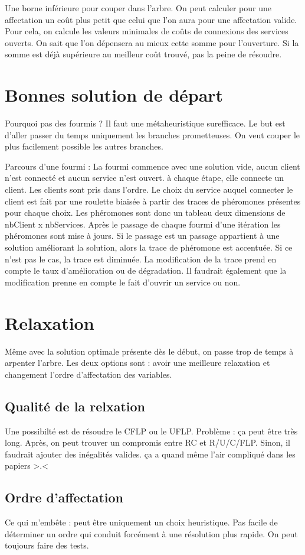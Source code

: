 Une borne inférieure pour couper dans l'arbre.
On peut calculer pour une affectation un coût plus petit que celui que l'on aura pour une affectation valide.
Pour cela, on calcule les valeurs minimales de coûts de connexions des services ouverts.
On sait que l'on dépensera au mieux cette somme pour l'ouverture. Si la somme est déjà supérieure au meilleur coût trouvé, pas la peine de résoudre.

\section{Bonnes solution de départ}

Pourquoi pas des fourmis ? Il faut une métaheuristique surefficace. Le but est d'aller passer du temps uniquement les branches prometteuses.
On veut couper le plus facilement possible les autres branches. \newline

Parcours d'une fourmi : La fourmi commence avec une solution vide, aucun client n'est connecté et aucun service n'est ouvert.
à chaque étape, elle connecte un client. Les clients sont pris dans l'ordre.
Le choix du service auquel connecter le client est fait par une roulette biaisée à partir des traces de phéromones présentes pour chaque choix.
Les phéromones sont donc un tableau deux dimensions de nbClient x nbServices.
Après le passage de chaque fourmi d'une itération les phéromones sont mise à jours.
Si le passage est un passage appartient à une solution améliorant la solution, alors la trace de phéromone est accentuée.
Si ce n'est pas le cas, la trace est diminuée. La modification de la trace prend en compte le taux d'amélioration ou de dégradation.
Il faudrait également que la modification prenne en compte le fait d'ouvrir un service ou non.

\section{Relaxation}

Même avec la solution optimale présente dès le début, on passe trop de temps à arpenter l'arbre.
Les deux options sont : avoir une meilleure relaxation et changement l'ordre d'affectation des variables.

\subsection{Qualité de la relxation}

Une possibilté est de résoudre le CFLP ou le UFLP. Problème : ça peut être très long. Après, on peut trouver un compromis entre RC et R/U/C/FLP.
Sinon, il faudrait ajouter des inégalités valides. ça a quand même l'air compliqué dans les papiers >.<

\subsection{Ordre d'affectation}

Ce qui m'embête : peut être uniquement un choix heuristique. Pas facile de déterminer un ordre qui conduit forcément à une résolution plus rapide.
On peut toujours faire des tests.
